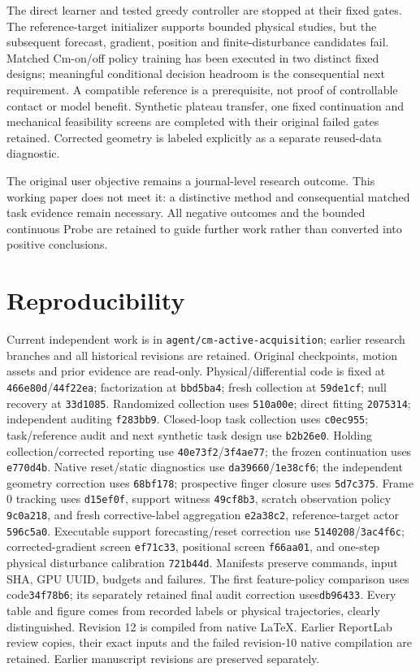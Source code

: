 \documentclass[10pt]{article}
\begin{document}
The direct learner and tested greedy controller are stopped at their fixed gates.
The reference-target initializer supports bounded physical studies, but the
subsequent forecast, gradient, position and finite-disturbance candidates fail.
Matched Cm-on/off policy training has been executed in two distinct fixed designs;
meaningful conditional decision headroom is the consequential next requirement. A compatible reference is a
prerequisite, not proof of controllable contact or model benefit. Synthetic plateau transfer, one fixed continuation and mechanical feasibility
screens are completed with their original failed gates retained. Corrected geometry
is labeled explicitly as a separate reused-data diagnostic.

The original user objective remains a journal-level research outcome. This working
paper does not meet it: a distinctive method and consequential matched task evidence
remain necessary. All negative outcomes and the bounded continuous Probe are retained
to guide further work rather than converted into positive conclusions.

\section*{Reproducibility}
Current independent work is in \texttt{agent/cm-active-acquisition}; earlier research branches and all historical revisions are retained. Original
checkpoints, motion assets and prior evidence are read-only. Physical/differential
code is fixed at \texttt{466e80d}/\texttt{44f22ea}; factorization at
\texttt{bbd5ba4}; fresh collection at \texttt{59de1cf}; null recovery at
\texttt{33d1085}. Randomized collection uses \texttt{510a00e}; direct fitting
\texttt{2075314}; independent auditing \texttt{f283bb9}. Closed-loop task
collection uses \texttt{c0ec955}; task/reference audit and next synthetic task
design use \texttt{b2b26e0}. Holding collection/corrected reporting use
\texttt{40e73f2}/\texttt{3f4ae77}; the frozen continuation uses \texttt{e770d4b}.
Native reset/static diagnostics use \texttt{da39660}/\texttt{1e38cf6}; the independent
geometry correction uses \texttt{68bf178}; prospective finger closure uses \texttt{5d7c375}. Frame 0 tracking uses \texttt{d15ef0f},
support witness \texttt{49cf8b3}, scratch observation policy \texttt{9c0a218}, and
fresh corrective-label aggregation \texttt{e2a38c2}, reference-target actor \texttt{596c5a0}.
Executable support forecasting/reset correction use \texttt{5140208}/\texttt{3ac4f6c};
corrected-gradient screen \texttt{ef71c33}, positional screen \texttt{f66aa01},
and one-step physical disturbance calibration \texttt{721b44d}.
Manifests preserve commands, input SHA, GPU UUID,
budgets and failures. The first feature-policy comparison uses code\texttt{34f78b6}; its separately
retained final audit correction uses\texttt{db96433}.
Every table and figure comes from recorded labels or physical trajectories, clearly distinguished.
Revision 12 is compiled from native LaTeX. Earlier ReportLab review copies,
their exact inputs and the failed revision-10 native compilation are retained. Earlier manuscript revisions are preserved separately.
\end{document}
